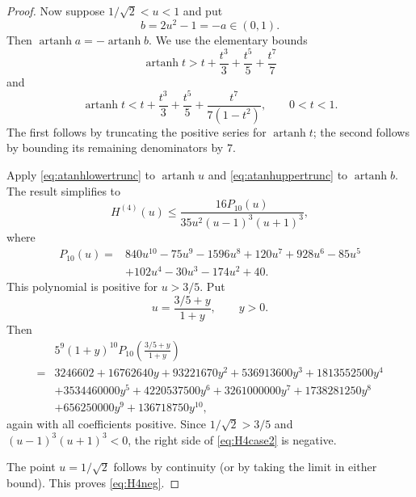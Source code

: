 \documentclass[10pt,a4paper]{amsart}
\newcommand{\artanh}{\operatorname{artanh}}
\begin{document}
\begin{proof}
Now suppose $1/\sqrt2<u<1$ and put
\[
b=2u^2-1=-a\in(0,1).
\]
Then $\artanh a=-\artanh b$.  We use the elementary bounds
\begin{equation}
\label{eq:atanhlowertrunc}
\artanh t>
 t+\frac{t^3}{3}+\frac{t^5}{5}+\frac{t^7}{7}
\end{equation}
and
\begin{equation}
\label{eq:atanhuppertrunc}
\artanh t<
 t+\frac{t^3}{3}+\frac{t^5}{5}
 +\frac{t^7}{7(1-t^2)},
\qquad 0<t<1.
\end{equation}
The first follows by truncating the positive series for $\artanh t$; the second follows by bounding its remaining denominators by $7$.

Apply \eqref{eq:atanhlowertrunc} to $\artanh u$ and \eqref{eq:atanhuppertrunc} to $\artanh b$.  The result simplifies to
\begin{equation}
\label{eq:H4case2}
H^{(4)}(u)
\le
\frac{16P_{10}(u)}{35u^2(u-1)^3(u+1)^3},
\end{equation}
where
\begin{align*}
P_{10}(u)={}&
840u^{10}-75u^9-1596u^8+120u^7+928u^6
-85u^5\\
&+102u^4-30u^3-174u^2+40.
\end{align*}
This polynomial is positive for $u>3/5$.  Put
\[
u=\frac{3/5+y}{1+y},
\qquad y>0.
\]
Then
\begin{align*}
&5^9(1+y)^{10}P_{10}\left(\frac{3/5+y}{1+y}\right)\\
={}&3246602+16762640y+93221670y^2+536913600y^3
+1813552500y^4\\
&+3534460000y^5+4220537500y^6+3261000000y^7
+1738281250y^8\\
&+656250000y^9+136718750y^{10},
\end{align*}
again with all coefficients positive.  Since $1/\sqrt2>3/5$ and $(u-1)^3(u+1)^3<0$, the right side of \eqref{eq:H4case2} is negative.

The point $u=1/\sqrt2$ follows by continuity (or by taking the limit in either bound).  This proves \eqref{eq:H4neg}.
\end{proof}
\end{document}
